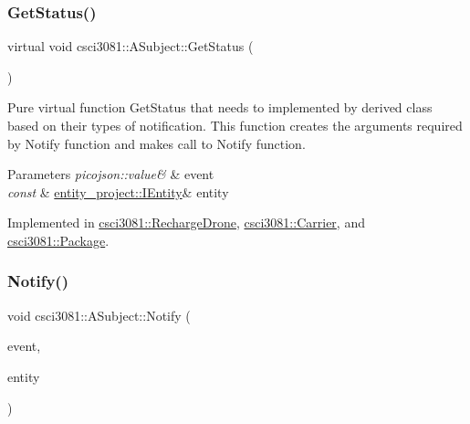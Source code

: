 \subsubsection{\texorpdfstring{Get\+Status()}{GetStatus()}}
{\footnotesize\ttfamily virtual void csci3081\+::\+A\+Subject\+::\+Get\+Status (\begin{DoxyParamCaption}{ }\end{DoxyParamCaption})\hspace{0.3cm}{\ttfamily [pure virtual]}}



Pure virtual function Get\+Status that needs to implemented by derived class based on their types of notification. This function creates the arguments required by Notify function and makes call to Notify function. 


\begin{DoxyParams}{Parameters}
{\em picojson\+::value\&} & event \\
\hline
{\em const} & \hyperlink{classentity__project_1_1IEntity}{entity\+\_\+project\+::\+I\+Entity}\& entity \\
\hline
\end{DoxyParams}


Implemented in \hyperlink{classcsci3081_1_1RechargeDrone_aa245b79215b39c86c1f9fde874bdf264}{csci3081\+::\+Recharge\+Drone}, \hyperlink{classcsci3081_1_1Carrier_a2b96f30454fee0766a5ed3a26fbf092c}{csci3081\+::\+Carrier}, and \hyperlink{classcsci3081_1_1Package_aaf2a9604fc4d3dd108e4b4002751be05}{csci3081\+::\+Package}.

\mbox{\label{classcsci3081_1_1ASubject_a2f219d68c9fc28373bb6f5e90170b4ae}} 
\subsubsection{\texorpdfstring{Notify()}{Notify()}}
{\footnotesize\ttfamily void csci3081\+::\+A\+Subject\+::\+Notify (\begin{DoxyParamCaption}\item[{picojson\+::value \&}]{event,  }\item[{const \hyperlink{classentity__project_1_1IEntity}{entity\+\_\+project\+::\+I\+Entity} \&}]{entity }\end{DoxyParamCaption})}




